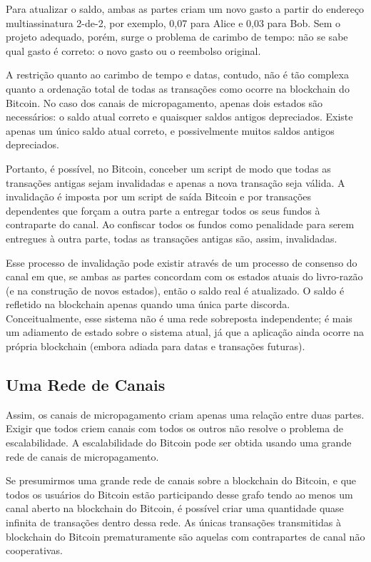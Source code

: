 \documentclass[letterpaper,11pt]{article}
\begin{document}
Para atualizar o saldo, ambas as partes criam um novo gasto a partir do
endereço multiassinatura 2-de-2, por exemplo, 0,07 para Alice e 0,03 para Bob.
Sem o projeto adequado, porém, surge o problema de carimbo de tempo: não se
sabe qual gasto é correto: o novo gasto ou o reembolso original.

A restrição quanto ao carimbo de tempo e datas, contudo, não é tão complexa
quanto a ordenação total de todas as transações como ocorre na blockchain do
Bitcoin. No caso dos canais de micropagamento, apenas dois estados são
necessários: o saldo atual correto e quaisquer saldos antigos depreciados.
Existe apenas um único saldo atual correto, e possivelmente muitos saldos
antigos depreciados.

Portanto, é possível, no Bitcoin, conceber um script de modo que todas as
transações antigas sejam invalidadas e apenas a nova transação seja válida.
A invalidação é imposta por um script de saída Bitcoin e por transações
dependentes que forçam a outra parte a entregar todos os seus fundos à
contraparte do canal. Ao confiscar todos os fundos como penalidade para serem
entregues à outra parte, todas as transações antigas são, assim, invalidadas.

Esse processo de invalidação pode existir através de um processo de consenso
do canal em que, se ambas as partes concordam com os estados atuais do
livro-razão (e na construção de novos estados), então o saldo real é
atualizado. O saldo é refletido na blockchain apenas quando uma única parte
discorda. Conceitualmente, esse sistema não é uma rede sobreposta independente;
é mais um adiamento de estado sobre o sistema atual, já que a aplicação ainda
ocorre na própria blockchain (embora adiada para datas e transações futuras).

\subsection{Uma Rede de Canais}

Assim, os canais de micropagamento criam apenas uma relação entre duas partes.
Exigir que todos criem canais com todos os outros não resolve o problema de
escalabilidade. A escalabilidade do Bitcoin pode ser obtida usando uma grande
rede de canais de micropagamento.

Se presumirmos uma grande rede de canais sobre a blockchain do Bitcoin, e que
todos os usuários do Bitcoin estão participando desse grafo tendo ao menos um
canal aberto na blockchain do Bitcoin, é possível criar uma quantidade quase
infinita de transações dentro dessa rede. As únicas transações transmitidas à
blockchain do Bitcoin prematuramente são aquelas com contrapartes de canal não
cooperativas.
\end{document}
